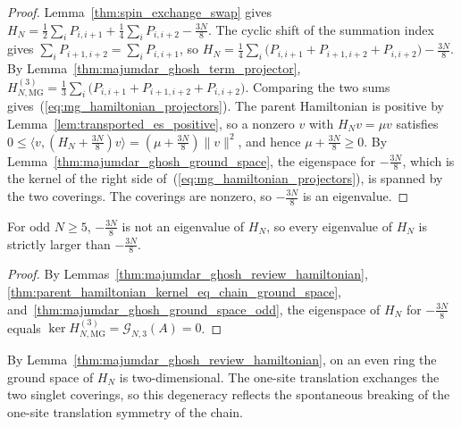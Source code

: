 \begin{proof}
    \leanok
    Lemma~\ref{thm:spin_exchange_swap} gives
    $H_{N}=\tfrac12\sum_{i}P_{i,i+1}+\tfrac14\sum_{i}P_{i,i+2}-\tfrac{3N}{8}$.
    The cyclic shift of the summation index gives
    $\sum_{i}P_{i+1,i+2}=\sum_{i}P_{i,i+1}$, so
    $H_{N}=\tfrac14\sum_{i}\bigl(P_{i,i+1}+P_{i+1,i+2}+P_{i,i+2}\bigr)
        -\tfrac{3N}{8}$.
    By Lemma~\ref{thm:majumdar_ghosh_term_projector},
    $H_{N,\mathrm{MG}}^{(3)}
        =\tfrac13\sum_{i}\bigl(P_{i,i+1}+P_{i+1,i+2}+P_{i,i+2}\bigr)$.
    Comparing the two sums gives~(\ref{eq:mg_hamiltonian_projectors}). The parent
    Hamiltonian is positive by Lemma~\ref{lem:transported_es_positive}, so a
    nonzero $v$ with $H_{N}v=\mu v$ satisfies
    $0\le\langle v,(H_{N}+\tfrac{3N}{8})v\rangle
        =(\mu+\tfrac{3N}{8})\lVert v\rVert^{2}$,
    and hence $\mu+\tfrac{3N}{8}\ge0$. By
    Lemma~\ref{thm:majumdar_ghosh_ground_space}, the eigenspace for
    $-\tfrac{3N}{8}$, which is the kernel of the right side
    of~(\ref{eq:mg_hamiltonian_projectors}), is spanned by the two coverings.
    The coverings are nonzero, so $-\tfrac{3N}{8}$ is an eigenvalue.
\end{proof}

\begin{lemma}%
    \label{thm:majumdar_ghosh_review_hamiltonian_odd}
    \leanok
    For odd $N\ge5$, $-\tfrac{3N}{8}$ is not an eigenvalue of $H_{N}$, so every
    eigenvalue of $H_{N}$ is strictly larger than $-\tfrac{3N}{8}$.
\end{lemma}

\begin{proof}
    \leanok
    By Lemmas~\ref{thm:majumdar_ghosh_review_hamiltonian},
    \ref{thm:parent_hamiltonian_kernel_eq_chain_ground_space},
    and~\ref{thm:majumdar_ghosh_ground_space_odd}, the eigenspace of $H_N$ for
    $-\tfrac{3N}{8}$ equals
    $\ker H_{N,\mathrm{MG}}^{(3)}=\mathcal G_{N,3}(A)=0$.
\end{proof}

\begin{remark}\label{rem:majumdar_ghosh_review_hamiltonian}
    By Lemma~\ref{thm:majumdar_ghosh_review_hamiltonian}, on an even ring the
    ground space of $H_{N}$ is two-dimensional. The one-site translation
    exchanges the two singlet coverings, so this degeneracy reflects the
    spontaneous breaking of the one-site translation symmetry of the chain.
\end{remark}

